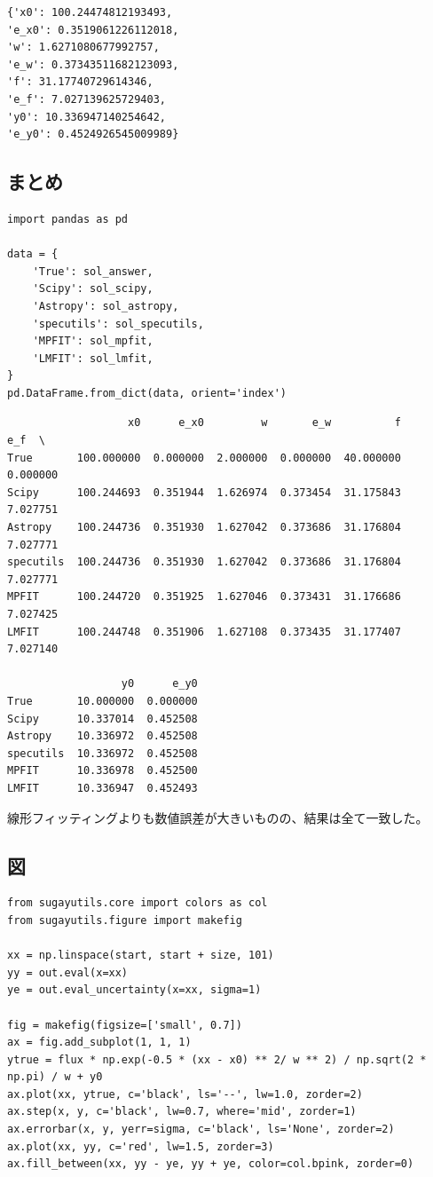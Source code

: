 \documentclass[a4paper, 9pt, notitlepage, uplatex, dvipdfmx]{jsarticle}
\begin{document}
\label{}
\begin{verbatim}
{'x0': 100.24474812193493,
'e_x0': 0.3519061226112018,
'w': 1.6271080677992757,
'e_w': 0.37343511682123093,
'f': 31.17740729614346,
'e_f': 7.027139625729403,
'y0': 10.336947140254642,
'e_y0': 0.4524926545009989}
\end{verbatim}
\subsection{まとめ}
\label{sec:org1d67503}
\begin{verbatim}
import pandas as pd

data = {
    'True': sol_answer,
    'Scipy': sol_scipy,
    'Astropy': sol_astropy,
    'specutils': sol_specutils,
    'MPFIT': sol_mpfit,
    'LMFIT': sol_lmfit,
}
pd.DataFrame.from_dict(data, orient='index')
\end{verbatim}

\label{}
\begin{verbatim}
                   x0      e_x0         w       e_w          f       e_f  \
True       100.000000  0.000000  2.000000  0.000000  40.000000  0.000000
Scipy      100.244693  0.351944  1.626974  0.373454  31.175843  7.027751
Astropy    100.244736  0.351930  1.627042  0.373686  31.176804  7.027771
specutils  100.244736  0.351930  1.627042  0.373686  31.176804  7.027771
MPFIT      100.244720  0.351925  1.627046  0.373431  31.176686  7.027425
LMFIT      100.244748  0.351906  1.627108  0.373435  31.177407  7.027140

                  y0      e_y0
True       10.000000  0.000000
Scipy      10.337014  0.452508
Astropy    10.336972  0.452508
specutils  10.336972  0.452508
MPFIT      10.336978  0.452500
LMFIT      10.336947  0.452493
\end{verbatim}

線形フィッティングよりも数値誤差が大きいものの、結果は全て一致した。
\subsection{図}
\label{sec:org5f9e9fd}
\begin{verbatim}
from sugayutils.core import colors as col
from sugayutils.figure import makefig

xx = np.linspace(start, start + size, 101)
yy = out.eval(x=xx)
ye = out.eval_uncertainty(x=xx, sigma=1)

fig = makefig(figsize=['small', 0.7])
ax = fig.add_subplot(1, 1, 1)
ytrue = flux * np.exp(-0.5 * (xx - x0) ** 2/ w ** 2) / np.sqrt(2 * np.pi) / w + y0
ax.plot(xx, ytrue, c='black', ls='--', lw=1.0, zorder=2)
ax.step(x, y, c='black', lw=0.7, where='mid', zorder=1)
ax.errorbar(x, y, yerr=sigma, c='black', ls='None', zorder=2)
ax.plot(xx, yy, c='red', lw=1.5, zorder=3)
ax.fill_between(xx, yy - ye, yy + ye, color=col.bpink, zorder=0)
\end{verbatim}
\end{document}
